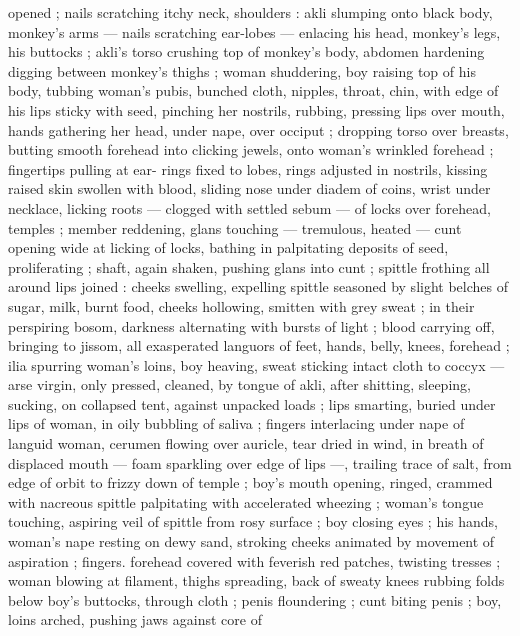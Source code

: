 opened ; nails scratching itchy neck, shoulders : akli slumping onto 
black body, monkey's arms --- nails scratching ear-lobes --- enlacing 
his head, monkey's legs, his buttocks ; akli's torso crushing top of 
monkey's body, abdomen hardening digging between monkey's 
thighs ; woman shuddering, boy raising top of his body, tubbing 
woman's pubis, bunched cloth, nipples, throat, chin, with edge of his 
lips sticky with seed, pinching her nostrils, rubbing, pressing lips 
over mouth, hands gathering her head, under nape, over occiput ; 
dropping torso over breasts, butting smooth forehead into clicking 
jewels, onto woman's wrinkled forehead ; fingertips pulling at ear- 
rings fixed to lobes, rings adjusted in nostrils, kissing raised skin 
swollen with blood, sliding nose under diadem of coins, wrist under 
necklace, licking roots --- clogged with settled sebum --- of locks 
over forehead, temples ; member reddening, glans touching --- 
tremulous, heated --- cunt opening wide at licking of locks, bathing 
in palpitating deposits of seed, proliferating ; shaft, again shaken, 
pushing glans into cunt ; spittle frothing all around lips joined : 
cheeks swelling, expelling spittle seasoned by slight belches of 
sugar, milk, burnt food, cheeks hollowing, smitten with grey sweat ; 
in their perspiring bosom, darkness alternating with bursts of light ; 
blood carrying off, bringing to jissom, all exasperated languors of 
feet, hands, belly, knees, forehead ; ilia spurring woman's loins, boy 
heaving, sweat sticking intact cloth to coccyx --- arse virgin, only 
pressed, cleaned, by tongue of akli, after shitting, sleeping, sucking, 
on collapsed tent, against unpacked loads ; lips smarting, buried 
under lips of woman, in oily bubbling of saliva ; fingers interlacing 
under nape of languid woman, cerumen flowing over auricle, tear 
dried in wind, in breath of displaced mouth --- foam sparkling over 
edge of lips ---, trailing trace of salt, from edge of orbit to frizzy 
down of temple ; boy's mouth opening, ringed, crammed with 
nacreous spittle palpitating with accelerated wheezing ; woman's 
tongue touching, aspiring veil of spittle from rosy surface ; boy 
closing eyes ; his hands, woman's nape resting on dewy sand, 
stroking cheeks animated by movement of aspiration ; fingers. 
forehead covered with feverish red patches, twisting tresses ; woman 
blowing at filament, thighs spreading, back of sweaty knees rubbing 
folds below boy's buttocks, through cloth ; penis floundering ; cunt 
biting penis ; boy, loins arched, pushing jaws against core of 
